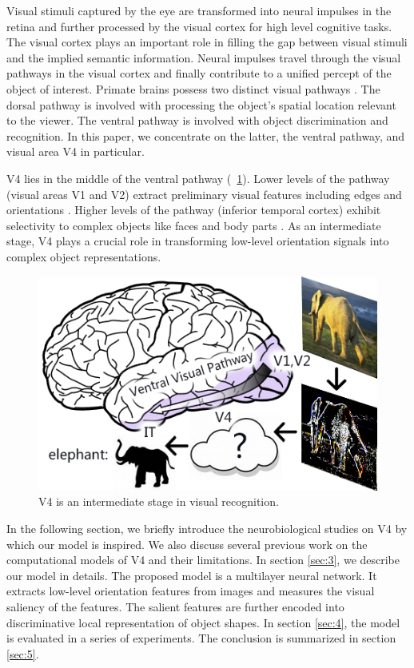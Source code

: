 \documentclass[conference]{IEEEtran}
\begin{document}
Visual stimuli captured by the eye are transformed into neural impulses in the retina 
and further processed by the visual cortex for high level cognitive tasks. 
The visual cortex plays an important role in filling the gap 
between visual stimuli and the implied semantic information.
Neural impulses travel through the visual pathways in the visual cortex 
and finally contribute to a unified percept of the object of interest.
Primate brains possess two distinct visual pathways \cite{ettlinger1990,lehky2007}.
The dorsal pathway is involved with processing the object's spatial location relevant to the viewer. 
The ventral pathway is involved with object discrimination and recognition.
In this paper, we concentrate on the latter, the ventral pathway, and visual area V4 in particular.

V4 lies in the middle of the ventral pathway (\figurename~\ref{fig:1}).
Lower levels of the pathway (visual areas V1 and V2) extract preliminary visual features 
including edges and orientations \cite{hubel1962,hubel1965}.
Higher levels of the pathway (inferior temporal cortex) exhibit selectivity to complex objects
like faces and body parts \cite{bruce1981,bell2009}.
As an intermediate stage, V4 plays a crucial role in transforming low-level orientation signals 
into complex object representations.

\begin{figure}[htp]
\centerline{\includegraphics[width=0.8\linewidth]{images/fig1.png}} 
\caption{V4 is an intermediate stage in visual recognition.}
\label{fig:1}
\end{figure}

In the following section, we briefly introduce the neurobiological studies on V4 by which our model is inspired.
We also discuss several previous work on the computational models of V4 and their limitations.
In section \ref{sec:3}, we describe our model in details.
The proposed model is a multilayer neural network.
It extracts low-level orientation features from images and measures the visual saliency of the features.
The salient features are further encoded into discriminative local representation of object shapes.
In section \ref{sec:4}, the model is evaluated in a series of experiments.
The conclusion is summarized in section \ref{sec:5}.
\end{document}
